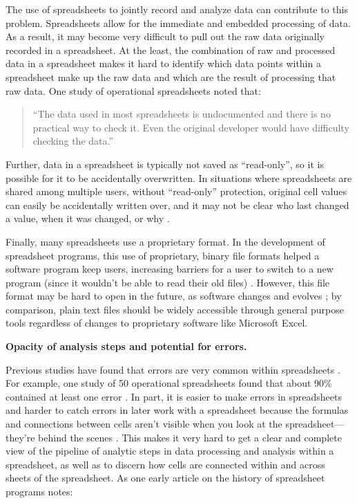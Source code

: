 \documentclass[]{tufte-book}
\begin{document}
The use of spreadsheets to jointly record and analyze data can contribute to
this problem. Spreadsheets allow for the immediate and embedded processing of
data. As a result, it may become very difficult to pull out the raw data
originally recorded in a spreadsheet. At the least, the combination of raw and
processed data in a spreadsheet makes it hard to identify which data points
within a spreadsheet make up the raw data and which are the result of processing
that raw data. One study of operational spreadsheets noted that:

\begin{quote}
``The data used in most spreadsheets is undocumented and there is no practical
way to check it. Even the original developer would have difficulty checking the
data.'' \citep{powell2009errors}
\end{quote}

Further, data in a spreadsheet is typically not saved as ``read-only'', so it is
possible for it to be accidentally overwritten. In situations where spreadsheets
are shared among multiple users, without ``read-only'' protection, original cell
values can easily be accidentally written over, and it may not be clear who last
changed a value, when it was changed, or why \citep{altarawneh2017pilot}.

Finally, many spreadsheets use a proprietary format. In the development of
spreadsheet programs, this use of proprietary, binary file formats helped a
software program keep users, increasing barriers for a user to switch to a new
program (since it wouldn't be able to read their old files)
\citep{campbell2007number}. However, this file format may be hard to open in the
future, as software changes and evolves \citep{michener2015ten}; by comparison, plain
text files should be widely accessible through general purpose tools regardless
of changes to proprietary software like Microsoft Excel.

\textbf{Opacity of analysis steps and potential for errors.}

Previous studies have found that errors are very common within spreadsheets
\citep{hermans2016spreadsheets}. For example, one study of 50 operational
spreadsheets found that about 90\% contained at least one error
\citep{powell2009errors}. In part, it is easier to make errors in spreadsheets and
harder to catch errors in later work with a spreadsheet because the formulas and
connections between cells aren't visible when you look at the
spreadsheet---they're behind the scenes \citep{birch2018future}. This makes it very
hard to get a clear and complete view of the pipeline of analytic steps in data
processing and analysis within a spreadsheet, as well as to discern how cells
are connected within and across sheets of the spreadsheet. As one early article on
the history of spreadsheet programs notes:
\end{document}
